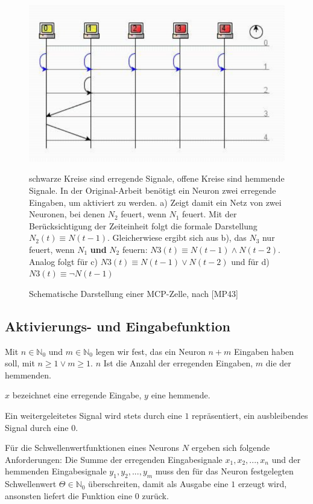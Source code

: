 \begin{figure}[h]
    \centering
    \includegraphics{images/p1ReadSeq.pdf}
    \caption{Schematische Darstellung einer MCP-Zelle, nach [MP43]}
    \small
     schwarze Kreise sind erregende Signale, offene Kreise sind hemmende Signale. In der Original-Arbeit benötigt ein Neuron zwei erregende Eingaben, um aktiviert zu werden. a) Zeigt damit ein Netz von zwei Neuronen, bei denen $N_2$ feuert, wenn $N_1$ feuert. Mit der Berücksichtigung der Zeiteinheit folgt die formale Darstellung $N_2(t) \equiv N(t - 1)$. Gleicherwiese ergibt sich aus b), das $N_3$ nur feuert, wenn $N_1$ \textbf{und} $N_2$ feuern: $N3(t) \equiv N(t - 1) \land N(t - 2)$. Analog folgt für c) $N3(t) \equiv N(t - 1) \lor N(t - 2)$ und für d) $N3(t) \equiv \neg N(t - 1)$
\label{fig-mcpcell}
\end{figure}


\subsection{Aktivierungs- und Eingabefunktion}\label{mcp-inputactivfunc}

Mit $n \in  \mathbb{N}_0$ und $m \in  \mathbb{N}_0$ legen wir fest, das ein Neuron $n + m$ Eingaben haben soll, mit $n \geq 1 \lor m \geq 1$. $n$ Ist die Anzahl der erregenden Eingaben, $m$ die der hemmenden.

$x$ bezeichnet eine erregende Eingabe, $y$ eine hemmende.

Ein weitergeleitetes Signal wird stets durch eine $1$ repräsentiert, ein ausbleibendes Signal durch eine $0$.

Für die Schwellenwertfunktionen eines Neurons $N$ ergeben sich folgende Anforderungen: Die Summe der erregenden Eingabesignale $x_1, x_2, ..., x_n$ und der hemmenden Eingabesignale $y_1, y_2, ..., y_m$  muss den für das Neuron festgelegten Schwellenwert $\Theta \in  \mathbb{N}_0$ überschreiten, damit als Ausgabe eine $1$ erzeugt wird, ansonsten liefert die Funktion eine $0$ zurück.


